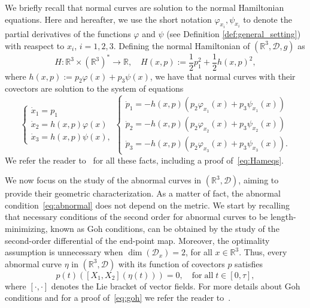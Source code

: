 \documentclass[12pt]{amsart}
\theoremstyle{plain}
\theoremstyle{definition}
\theoremstyle{remark}
\numberwithin{equation}{section}
\newcommand{\R}{\mathbb{R}}
\newcommand{\D}{\mathcal{D}}
\newcommand{\<}{\langle}
\renewcommand{\>}{\rangle}
\newcommand{\0}{\theta}
\newcommand{\1}{{-1}}
\renewcommand{\=}{\coloneqq}
\renewcommand{\.}{\dots}
\renewcommand{\-}{\cdot}
\renewcommand{\:}{\,:\,}
\newcommand{\mr}{\mathrm}
\theoremstyle{definition}
\begin{document}
We briefly recall that normal curves are solution to the normal Hamiltonian equations. Here and hereafter, we use the short notation $\varphi_{x_i},\psi_{x_i}$ to denote the partial derivatives of the functions $\varphi$ and $\psi$ (see Definition \ref{def:general_setting}) with reaspect to $x_i$, $i=1,2,3$. Defining the normal Hamiltonian of $(\R^3,\D,g)$ as
\begin{equation}
	\label{eq:H}
	H:\R^3\times(\R^3)^*\to \R, \quad H(x,p):= \frac12 p_1^2 + \frac12 h(x,p)^2,
\end{equation} 
where $h(x,p):=p_2\varphi(x)+p_3\psi(x)$, we have that normal curves with their covectors are solution to the system of equations
\begin{equation}
	\label{eq:Hameqs}
	\begin{cases}
		\dot x_1=p_1\\
		\dot x_2=h(x,p)\varphi(x)\\
		\dot x_3=h(x,p)\psi(x),
	\end{cases}
	\begin{cases}
		\dot p_1=-h(x,p)(p_2\varphi_{x_1}(x)+p_3\psi_{x_1}(x))\\
		\dot p_2=-h(x,p)(p_2\varphi_{x_2}(x)+p_3\psi_{x_2}(x))\\
		\dot p_3=-h(x,p)(p_2\varphi_{x_3}(x)+p_3\psi_{x_3}(x)).
	\end{cases}
\end{equation}
We refer the reader to~\cite{ABB20, Rif14} for all these facts, including a proof of~\eqref{eq:Hameqs}.

We now focus on the study of the abnormal curves in $(\R^3,\D)$, aiming to provide their geometric characterization. As a matter of fact, the abnormal condition~\eqref{eq:abnormal} does not depend on the metric. We start by recalling that necessary conditions of the second order for abnormal curves to be length-minimizing, known as Goh conditions, can be obtained by the study of the second-order differential of the end-point map. Moreover, the optimality  assumption is unnecessary when $\dim(\D_x)=2$, for all $x\in\R^3$. Thus, every abnormal curve $\eta$ in $(\R^3,\D)$ with its function of covectors $p$ satisfies
\begin{equation}
	\label{eq:goh}
	p(t)([X_1,X_2](\eta(t)))=0, \quad \mr{for \; all} \; t\in[0,\tau],
\end{equation}
where $[\cdot,\cdot]$ denotes the Lie bracket of vector fields. For more details about Goh conditions and for a proof of~\eqref{eq:goh} we refer the reader to~\cite{ABB20}.
\end{document}
